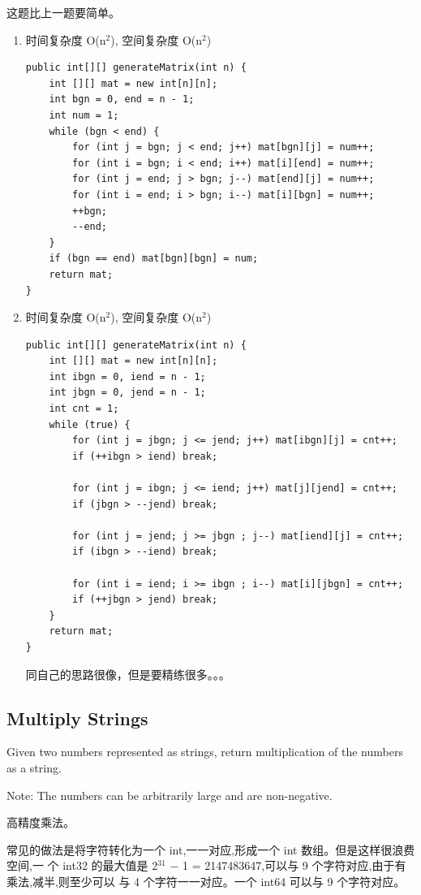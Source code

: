 \documentclass[12pt]{book}
\begin{document}
这题比上一题要简单。
\begin{enumerate}
\item 时间复杂度 O(n$^{\text{2}}$), 空间复杂度 O(n$^{\text{2}}$)
\label{sec-20-1-8-1}
\lstset{language=java,label= ,caption= ,numbers=none}
\begin{lstlisting}
public int[][] generateMatrix(int n) {
    int [][] mat = new int[n][n];
    int bgn = 0, end = n - 1;
    int num = 1;
    while (bgn < end) {
        for (int j = bgn; j < end; j++) mat[bgn][j] = num++;
        for (int i = bgn; i < end; i++) mat[i][end] = num++;
        for (int j = end; j > bgn; j--) mat[end][j] = num++;
        for (int i = end; i > bgn; i--) mat[i][bgn] = num++;
        ++bgn;
        --end;
    }
    if (bgn == end) mat[bgn][bgn] = num;
    return mat;
}
\end{lstlisting}
\item 时间复杂度 O(n$^{\text{2}}$), 空间复杂度 O(n$^{\text{2}}$)
\label{sec-20-1-8-2}
\lstset{language=java,label= ,caption= ,numbers=none}
\begin{lstlisting}
public int[][] generateMatrix(int n) {
    int [][] mat = new int[n][n];
    int ibgn = 0, iend = n - 1;
    int jbgn = 0, jend = n - 1;
    int cnt = 1;
    while (true) {
        for (int j = jbgn; j <= jend; j++) mat[ibgn][j] = cnt++;
        if (++ibgn > iend) break;
                
        for (int j = ibgn; j <= iend; j++) mat[j][jend] = cnt++;
        if (jbgn > --jend) break;

        for (int j = jend; j >= jbgn ; j--) mat[iend][j] = cnt++;
        if (ibgn > --iend) break;
                
        for (int i = iend; i >= ibgn ; i--) mat[i][jbgn] = cnt++;
        if (++jbgn > jend) break;
    }
    return mat;
}
\end{lstlisting}

同自己的思路很像，但是要精练很多。。。
\end{enumerate}

\subsection{Multiply Strings}
\label{sec-20-1-9}
Given two numbers represented as strings, return multiplication of the numbers as a string.

Note: The numbers can be arbitrarily large and are non-negative.

高精度乘法。

常见的做法是将字符转化为一个 int,一一对应,形成一个 int 数组。但是这样很浪费空间,一
个 int32 的最大值是 2$^{\text{31}}$ − 1 = 2147483647,可以与 9 个字符对应,由于有乘法,减半,则至少可以
与 4 个字符一一对应。一个 int64 可以与 9 个字符对应。
\end{document}
